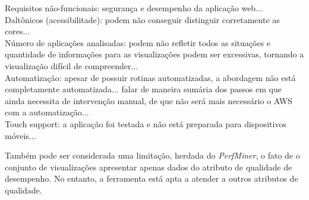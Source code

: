 {\color{red}Requisitos não-funcionais: segurança e desempenho da aplicação web...}\\
{\color{red}Daltônicos (acessibilitade): podem não conseguir distinguir corretamente as cores...}\\
{\color{red}Número de aplicações analisadas: podem não refletir todos as situações e quantidade de informações para as visualizações podem ser excessivas, tornando a visualização difícil de compreender...}\\
{\color{red}Automatização: apesar de possuir rotinas automatizadas, a abordagem não está completamente automatizada... falar de maneira sumária dos passos em que ainda necessita de intervenção manual, de que não será mais necessário o AWS com a automatização...}\\
{\color{red}Touch support: a aplicação foi testada e não está preparada para dispositivos móveis...}

Também pode ser considerada uma limitação, herdada do \textit{PerfMiner}, o fato de o conjunto de visualizações apresentar apenas dados do atributo de qualidade de  desempenho. No entanto, a ferramenta está apta a atender a outros atributos de qualidade.